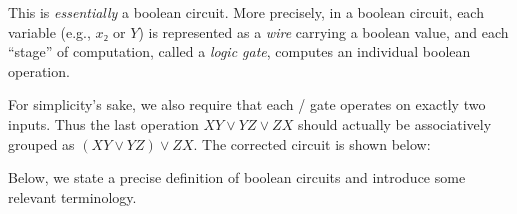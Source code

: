 {  This is \emph{essentially} a boolean circuit.  More precisely, in a boolean
  circuit, each variable (e.g., \(x₂\) or \(Y\)) is represented as a \emph{wire}
  carrying a boolean value, and each ``stage'' of computation, called a
  \emph{logic gate}, computes an individual boolean operation.

  For simplicity's sake, we also require that each \AND/\OR{} gate operates on
  exactly two inputs.  Thus the last \OR{} operation \(XY∨YZ∨ZX\) should
  actually be associatively grouped as \((XY∨YZ)∨ZX\).  The corrected circuit
  is shown below:

  \begin{center}
  \end{center}

}


Below, we state a precise definition of boolean circuits and introduce some
relevant terminology.

